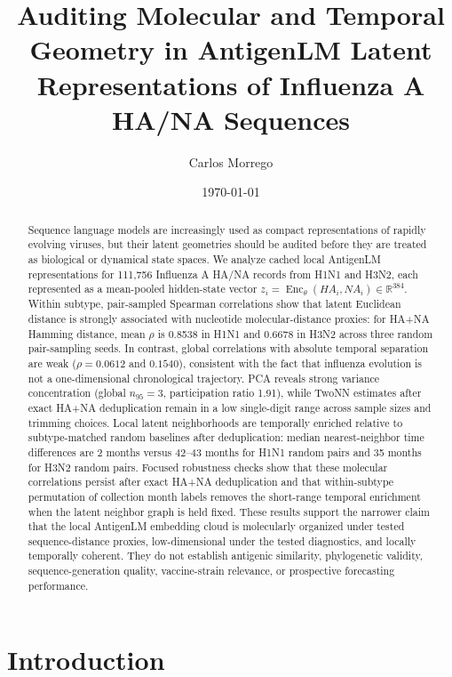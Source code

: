 \documentclass[11pt]{article}
\title{Auditing Molecular and Temporal Geometry in AntigenLM Latent Representations of Influenza A HA/NA Sequences}
\author{Carlos Morrego}
\date{\today}
\newcommand{\Enc}{\operatorname{Enc}}
\newcommand{\R}{\mathbb{R}}
\begin{document}
\maketitle

\begin{abstract}
Sequence language models are increasingly used as compact representations of rapidly evolving viruses, but their latent geometries should be audited before they are treated as biological or dynamical state spaces. We analyze cached local AntigenLM representations for 111,756 Influenza A HA/NA records from H1N1 and H3N2, each represented as a mean-pooled hidden-state vector $z_i=\Enc_{\theta}(HA_i,NA_i)\in\R^{384}$. Within subtype, pair-sampled Spearman correlations show that latent Euclidean distance is strongly associated with nucleotide molecular-distance proxies: for HA+NA Hamming distance, mean $\rho$ is 0.8538 in H1N1 and 0.6678 in H3N2 across three random pair-sampling seeds. In contrast, global correlations with absolute temporal separation are weak ($\rho=0.0612$ and $0.1540$), consistent with the fact that influenza evolution is not a one-dimensional chronological trajectory. PCA reveals strong variance concentration (global $n_{95}=3$, participation ratio 1.91), while TwoNN estimates after exact HA+NA deduplication remain in a low single-digit range across sample sizes and trimming choices. Local latent neighborhoods are temporally enriched relative to subtype-matched random baselines after deduplication: median nearest-neighbor time differences are 2 months versus 42--43 months for H1N1 random pairs and 35 months for H3N2 random pairs. Focused robustness checks show that these molecular correlations persist after exact HA+NA deduplication and that within-subtype permutation of collection month labels removes the short-range temporal enrichment when the latent neighbor graph is held fixed. These results support the narrower claim that the local AntigenLM embedding cloud is molecularly organized under tested sequence-distance proxies, low-dimensional under the tested diagnostics, and locally temporally coherent. They do not establish antigenic similarity, phylogenetic validity, sequence-generation quality, vaccine-strain relevance, or prospective forecasting performance.
\end{abstract}

\section{Introduction}
\end{document}
